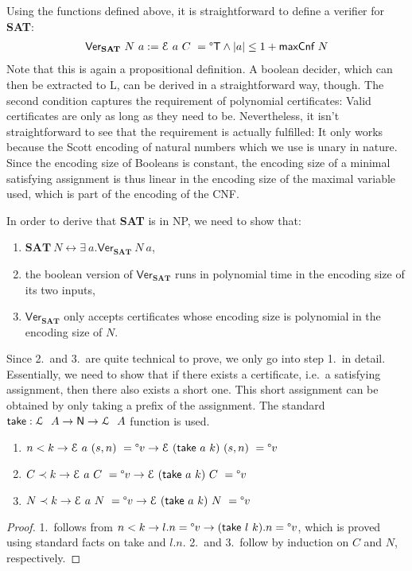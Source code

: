 \documentclass[a4paper,UKenglish,cleveref, autoref]{lipics-v2019}
\begin{document}
Using the functions defined above, it is straightforward to define a verifier for \textbf{SAT}:
\begin{align*}
  \textsf{Ver}_{\textbf{SAT}}~N~a := \mathcal{E}~a~C~ = \degree\mathsf{T} \land |a| \le 1 +{\textsf{maxCnf}~N} 
\end{align*}
Note that this is again a propositional definition. A boolean decider, which can then be extracted to L, can be derived in a straightforward way, though. The second condition captures the requirement of polynomial certificates: Valid certificates are only as long as they need to be. Nevertheless, it isn't straightforward to see that the requirement is actually fulfilled: It only works because the Scott encoding of natural numbers which we use is unary in nature. Since the encoding size of Booleans is constant, the encoding size of a minimal satisfying assignment is thus linear in the encoding size of the maximal variable used, which is part of the encoding of the CNF.

In order to derive that \textbf{SAT} is in NP, we need to show that:
\begin{enumerate}
  \item $\textbf{SAT}~N \leftrightarrow \exists~a. \textsf{Ver}_{\textbf{SAT}}~N~a$,
  \item the boolean version of $\textsf{Ver}_\textbf{SAT}$ runs in polynomial time in the encoding size of its two inputs,
  \item $\textsf{Ver}_\textbf{SAT}$ only accepts certificates whose encoding size is polynomial in the encoding size of $N$.
\end{enumerate}

Since 2.\ and 3.\ are quite technical to prove, we only go into step 1.\ in detail. Essentially, we need to show that if there exists a certificate, i.e.\ a satisfying assignment, then there also exists a short one. This short assignment can be obtained by only taking a prefix of the assignment. The standard $\textsf{take} : \mathcal{L}~~A \rightarrow \mathsf{N} \rightarrow \mathcal{L}~~A$ function is used.

\begin{lemma}\label{prop:boundedcapassgn}\leavevmode
  \begin{enumerate}
    \item $n < k \rightarrow \mathcal{E}~a~(s, n)~ = \degree v \rightarrow \mathcal{E}~(\normalfont\textsf{take}~a~k)~(s, n)~ = \degree v$
    \item $C \prec k \rightarrow \mathcal{E}~a~C~ = \degree v \rightarrow \mathcal{E}~(\normalfont\textsf{take}~a~k)~C~ = \degree v$
    \item $N \prec k \rightarrow \mathcal{E}~a~N~ = \degree v \rightarrow \mathcal{E}~(\normalfont\textsf{take}~a~k)~N~ = \degree v$
  \end{enumerate}
\end{lemma}
\begin{proof}
  1.\ follows from $n < k \rightarrow l.n = \degree v \rightarrow (\textsf{take}~l~k).n = \degree v$, which is proved using standard facts on \textsf{take} and $l.n$.
  2.\ and 3.\ follow by induction on $C$ and $N$, respectively.
\end{proof}
\end{document}
